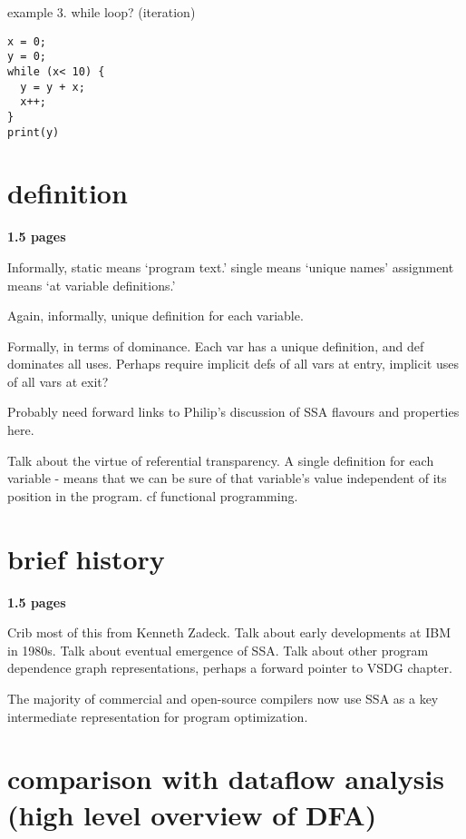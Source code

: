 example 3. while loop? (iteration)

\begin{verbatim}
x = 0;
y = 0;
while (x< 10) {
  y = y + x;
  x++;
}
print(y)
\end{verbatim}




\section{definition}

\textbf{1.5 pages}

Informally, static means `program text.'
single means `unique names'
assignment means `at variable definitions.'

Again, informally, unique definition for each variable.

Formally, in terms of dominance. Each var has a unique
definition, and def dominates all uses.
Perhaps require implicit defs of all vars at entry,
implicit uses of all vars at exit?

Probably need forward links to Philip's discussion of
SSA flavours and properties here.

Talk about the virtue of referential transparency. A single
definition for each variable - means that we can be sure
of that variable's value independent of its
position in the program. cf functional programming.


\section{brief history}

\textbf{1.5 pages}

Crib most of this from Kenneth Zadeck. 
Talk about early developments at IBM in 1980s.
Talk about eventual emergence of SSA.
Talk about other program dependence graph
representations, perhaps a forward pointer to 
VSDG chapter.

The majority of commercial and open-source compilers
now use SSA as a key intermediate representation for
program optimization.


\section{comparison with dataflow analysis (high level overview of DFA)}

